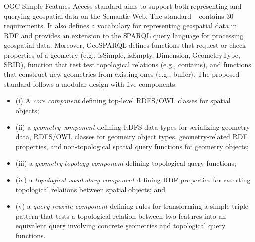 OGC-Simple Features Access standard aims to support both representing and querying geospatial data on the Semantic Web. The standard ~\cite{ogc2012} contains 30 requirements. It also defines a vocabulary for representing geospatial data in RDF and provides an extension to the SPARQL query language for processing geospatial data. 
Moreover, GeoSPARQL defines functions that request or check properties of a geometry (e.g., isSimple, isEmpty, Dimension, GeometryType, SRID), function that test test topological relations (e.g., contains),
and functions that construct new geometries from existing ones (e.g., buffer). 
 The proposed standard follows a modular design with five components: 
\begin{itemize}
\item (i) A \textit{core component} defining top-level RDFS/OWL classes for spatial objects; 
\item (ii) a \textit{geometry component} defining RDFS data types for serializing geometry data, RDFS/OWL classes for geometry object types, geometry-related RDF properties, and non-topological spatial query functions for geometry objects; 
\item (iii) a \textit{geometry topology component} defining topological query functions; 
\item (iv) a \textit{topological vocabulary component} defining RDF properties for asserting topological relations between spatial objects; and 
\item (v) a \textit{query rewrite component} defining rules for transforming a simple triple pattern that tests a topological relation between two features into an equivalent query involving concrete geometries and topological query functions.
\end{itemize}

